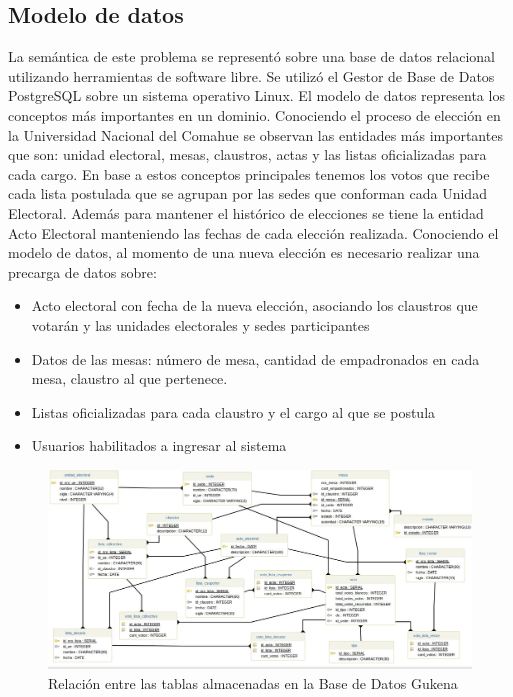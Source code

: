 \subsection{Modelo de datos}

La semántica de este problema se representó sobre una base de datos relacional utilizando herramientas de software libre. Se utilizó el Gestor de Base de Datos PostgreSQL sobre un sistema operativo Linux. El modelo de datos representa los conceptos más importantes en un dominio. Conociendo el proceso de elección en la Universidad Nacional del Comahue se observan las entidades más importantes que son: unidad electoral, mesas, claustros, actas y las listas oficializadas para cada cargo. En base a estos conceptos principales tenemos los votos que recibe cada lista postulada que se agrupan por las sedes que conforman cada Unidad Electoral. Además para mantener el histórico de elecciones se tiene la entidad Acto Electoral manteniendo las fechas de cada elección realizada.\newline
Conociendo el modelo de datos, al momento de una nueva elección es necesario realizar una precarga de datos sobre:
\begin{itemize}
    \item Acto electoral con fecha de la nueva elección, asociando los claustros que votarán y las unidades electorales y sedes participantes
    \item Datos de las mesas: número de mesa, cantidad de empadronados en cada mesa, claustro al que pertenece.
    \item Listas oficializadas para cada claustro y el cargo al que se postula
    \item Usuarios habilitados a ingresar al sistema
\end{itemize}
\begin{figure}[h!]
  \includegraphics[width=\textwidth]{img/gu_kena_diagramaBD.jpg}
  \caption{Relación entre las tablas almacenadas en la Base de Datos Gukena}
  \label{graf:diagramaBD}
\end{figure}

